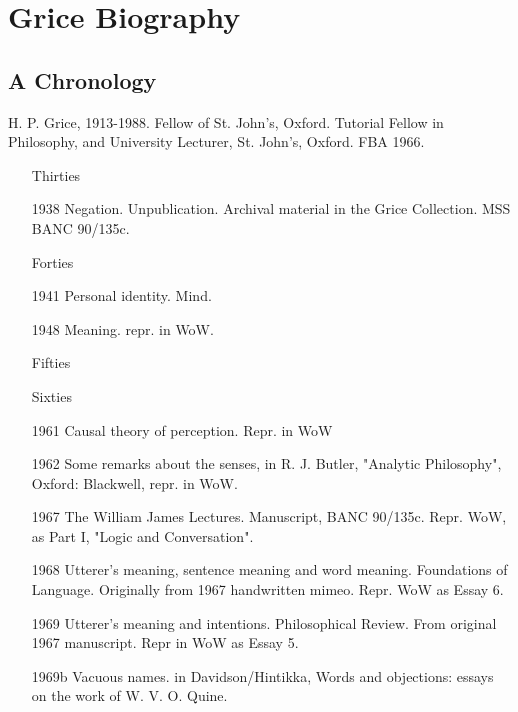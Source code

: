 \documentclass[10pt,titlepage]{book}
\begin{document}
\chapter{Grice Biography}

\section{A Chronology}
H. P. Grice, 1913-1988.
Fellow of St. John's, Oxford. Tutorial Fellow in Philosophy, and
University Lecturer, St. John's, Oxford.
FBA 1966.


\begin{itemize}

\item[Thirties]

\item[1938] Negation. Unpublication. Archival material in the Grice
Collection. MSS BANC 90/135c.

\item[Forties]

\item[1941] Personal identity. Mind.
\item[1948] Meaning. repr. in WoW.

\item[Fifties]

\item[Sixties]

\item[1961] Causal theory of perception. Repr. in WoW

\item[1962] Some remarks about the senses, in R. J. Butler, "Analytic
Philosophy", Oxford: Blackwell, repr. in WoW.

\item[1967] The William James Lectures. Manuscript, BANC 90/135c. Repr. WoW,
as Part I, "Logic and Conversation".

\item[1968] Utterer's meaning, sentence meaning and word meaning. Foundations
of Language. Originally from 1967 handwritten mimeo. Repr. WoW as Essay
6.

\item[1969] Utterer's meaning and intentions. Philosophical Review. From
original 1967 manuscript. Repr in WoW as Essay 5.

\item[1969b] Vacuous names. in Davidson/Hintikka, Words and objections:
essays on the work of W. V. O. Quine.



\end{itemize}
\end{document}
